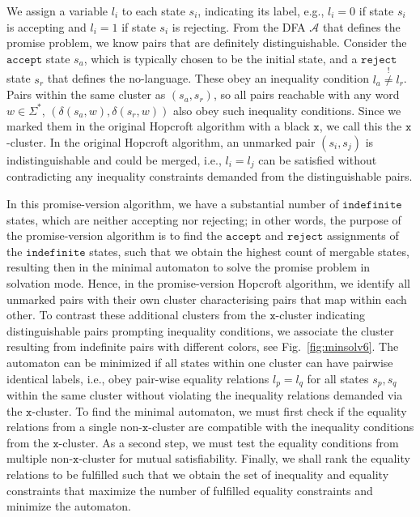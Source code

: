\documentclass[../main.tex]{subfiles}
\begin{document}
We assign a variable $l_i$ to each state $s_i$, indicating its label, e.g., $l_i = 0$ if state $s_i$ is accepting and $l_i = 1$ if state $s_i$ is rejecting. From the DFA $\mathcal{A}$ that defines the promise problem, we know pairs that are definitely distinguishable. Consider the $\mathtt{accept}$ state $s_a$, which is typically chosen to be the initial state, and a $\mathtt{reject}$  state $s_r$ that defines the no-language. These obey an inequality condition $l_a \overset{!}{\neq} l_r$. Pairs within the same cluster as $(s_a,s_r)$, so all pairs reachable with any word $w \in \Sigma^*$, $(\delta(s_a, w), \delta(s_r, w))$ also obey such inequality conditions. Since we marked them in the original Hopcroft algorithm with a black $\mathtt{x}$, we call this the $\mathtt{x}$-cluster. 
In the original Hopcroft algorithm, an unmarked pair $(s_i,s_j)$ is indistinguishable and could be merged, i.e., $l_i = l_j$ can be satisfied without contradicting any inequality constraints demanded from the distinguishable pairs. 

In this promise-version algorithm, we have a substantial number of $\mathtt{indefinite}$ states, which are neither accepting nor rejecting; in other words, the purpose of the promise-version algorithm is to find the $\mathtt{accept}$ and $\mathtt{reject}$  assignments of the $\mathtt{indefinite}$ states, such that we obtain the highest count of mergable states, resulting then in the minimal automaton to solve the promise problem in solvation mode. 
Hence, in the promise-version Hopcroft algorithm, we identify all unmarked pairs with their own cluster characterising pairs that map within each other. To contrast these additional clusters from the $\mathtt{x}$-cluster indicating distinguishable pairs prompting inequality conditions, we associate the cluster resulting from indefinite pairs with different colors, see Fig.~\ref{fig:minsolv6}. 
The automaton can be minimized if all states within one cluster can have pairwise identical labels, i.e., obey pair-wise equality relations $l_p = l_q$ for all states $s_p, s_q$ within the same cluster without violating the inequality relations demanded via the $\mathtt{x}$-cluster.
To find the minimal automaton, we must first check if the equality relations from a single non-$\mathtt{x}$-cluster are compatible with the inequality conditions from the $\mathtt{x}$-cluster. As a second step, we must test the equality conditions from multiple non-$\mathtt{x}$-cluster for mutual satisfiability. Finally, we shall rank the equality relations to be fulfilled such that we obtain the set of inequality and equality constraints that maximize the number of fulfilled equality constraints and minimize the automaton.
\end{document}
